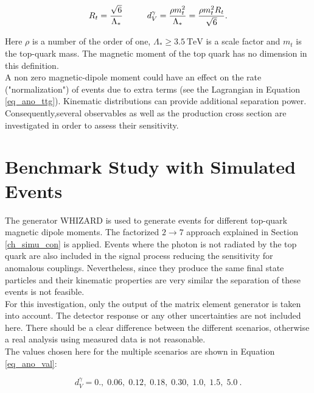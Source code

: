 \begin{equation}
R_t = \frac{\sqrt{6}}{\Lambda_{\ast}} \hspace{1.cm} d_V^{\gamma} = \frac{\rho m_t^2}{\Lambda_{\ast}} = \frac{\rho m_t^2 R_t}{\sqrt{6}}.
\label{eq_ano_rad}
\end{equation}

Here $\rho$ is a number of the order of one, $\Lambda_{\ast} \geq \SI{3.5}{\tera \electronvolt}$ is a scale factor and $m_t$ is the top-quark mass. The magnetic moment of the top quark has no dimension in this definition.\\
A non zero magnetic-dipole moment could have an effect on the rate ("normalization") of \ttgamma events due to extra terms (see the Lagrangian in Equation \ref{eq_ano_ttg}). Kinematic distributions can provide additional separation power. Consequently,several observables as well as the production cross section are investigated in order to assess their sensitivity.

\section{Benchmark Study with Simulated Events}
\label{sec_ano_simu}

The generator WHIZARD is used to generate events for different top-quark magnetic dipole moments. The factorized $2 \to 7$ approach explained in Section \ref{ch_simu_con} is applied.
Events where the photon is not radiated by the top quark are also included in the signal process reducing the sensitivity for anomalous couplings. Nevertheless, since they produce the same final state particles and their kinematic properties are very similar the separation of these events is not feasible.\\
For this investigation, only the output of the matrix element generator is taken into account. The detector response or any other uncertainties are not included here.
There should be a clear difference between the different scenarios, otherwise a real analysis using measured data is not reasonable.\\
The values chosen here for the multiple scenarios are shown in Equation \ref{eq_ano_val}:

\begin{equation}
d_V^{\gamma} = 0.,\; 0.06,\; 0.12,\; 0.18,\; 0.30, \; 1.0, \; 1.5, \; \SI{5.0}{}.
\label{eq_ano_val}
\end{equation}

